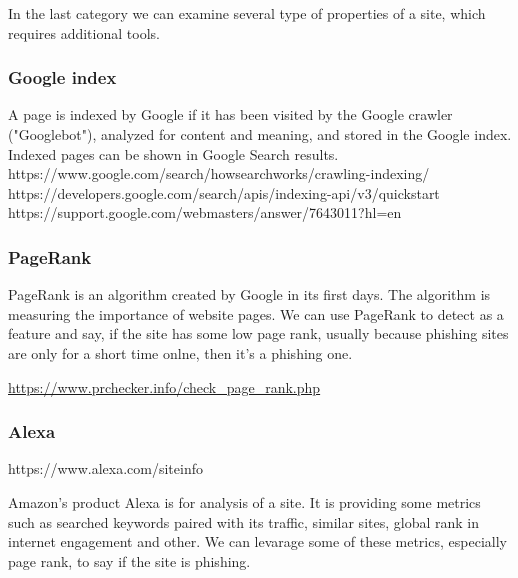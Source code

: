 \documentclass[
  digital, %
  oneside, %
  table,   %
  nolof,     %
  nolot,     %
]{fithesis3}
\newcounter{feature}
\newenvironment{feature}[1]{\stepcounter{feature}%
    \tcolorbox[beamer,%
    noparskip,breakable,
    colback=LightBlue,colframe=DarkBlue,%
    colbacklower=DarkBlue!75!LightBlue,%
    title=Feature~\thefeature: #1]}%
    {\endtcolorbox}
\begin{document}
In the last category we can examine several type of properties of a site, which requires additional tools. 

\subsubsection{Google index}

A page is indexed by Google if it has been visited by the Google crawler ("Googlebot"), analyzed for content and meaning, and stored in the Google index. Indexed pages can be shown in Google Search results. 
https://www.google.com/search/howsearchworks/crawling-indexing/
https://developers.google.com/search/apis/indexing-api/v3/quickstart
https://support.google.com/webmasters/answer/7643011?hl=en

\begin{feature}{Google index}

\end{feature}

\subsubsection{PageRank}

PageRank \cite{https://patents.google.com/patent/US7058628B1/en} is an algorithm created by Google in its first days. The algorithm is measuring the importance of website pages. We can use PageRank to detect as a feature and say, if the site has some low page rank, usually because phishing sites are only for a short time onlne, then it's a phishing one.

\begin{feature}{PageRank}

\end{feature}
\url{https://www.prchecker.info/check_page_rank.php}

\subsubsection{Alexa}

https://www.alexa.com/siteinfo

Amazon's product Alexa is for analysis of a site. It is providing some metrics such as searched keywords paired with its traffic, similar sites, global rank in internet engagement and other. We can levarage some of these metrics, especially page rank, to say if the site is phishing.

\begin{feature}{Alexa siteinfo}

\end{feature}
\end{document}
